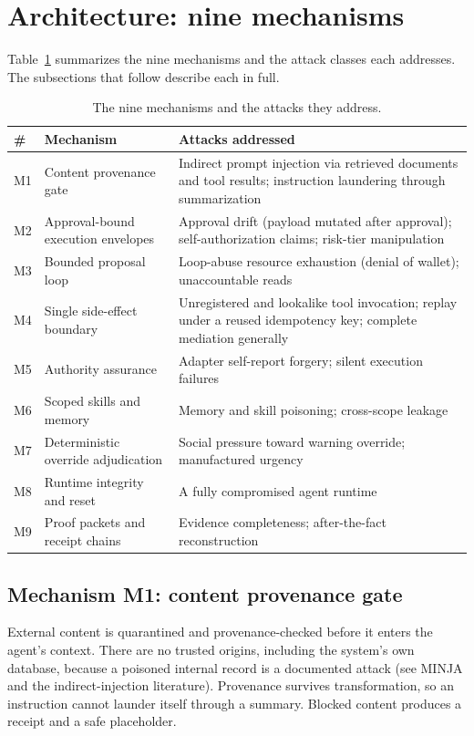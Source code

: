 \documentclass[11pt,letterpaper]{article}
\newcommand{\mech}[2]{\subsection{Mechanism #1: #2}\label{mech:#1}}
\begin{document}
\section{Architecture: nine mechanisms}\label{sec:architecture}

Table~\ref{tab:mechanisms} summarizes the nine mechanisms and the attack classes each addresses. The subsections that follow describe each in full.

\begin{table}[htbp]
\centering
\small
\caption{The nine mechanisms and the attacks they address.}
\label{tab:mechanisms}
\begin{tabular}{@{}p{0.5cm}p{4.6cm}p{9.2cm}@{}}
\toprule
\textbf{\#} & \textbf{Mechanism} & \textbf{Attacks addressed} \\
\midrule
M1 & Content provenance gate & Indirect prompt injection via retrieved documents and tool results; instruction laundering through summarization \\
M2 & Approval-bound execution envelopes & Approval drift (payload mutated after approval); self-authorization claims; risk-tier manipulation \\
M3 & Bounded proposal loop & Loop-abuse resource exhaustion (denial of wallet); unaccountable reads \\
M4 & Single side-effect boundary & Unregistered and lookalike tool invocation; replay under a reused idempotency key; complete mediation generally \\
M5 & Authority assurance & Adapter self-report forgery; silent execution failures \\
M6 & Scoped skills and memory & Memory and skill poisoning; cross-scope leakage \\
M7 & Deterministic override adjudication & Social pressure toward warning override; manufactured urgency \\
M8 & Runtime integrity and reset & A fully compromised agent runtime \\
M9 & Proof packets and receipt chains & Evidence completeness; after-the-fact reconstruction \\
\bottomrule
\end{tabular}
\end{table}

\mech{M1}{content provenance gate}
External content is quarantined and provenance-checked before it enters the agent's context. There are no trusted origins, including the system's own database, because a poisoned internal record is a documented attack (see MINJA and the indirect-injection literature). Provenance survives transformation, so an instruction cannot launder itself through a summary. Blocked content produces a receipt and a safe placeholder.
\end{document}
